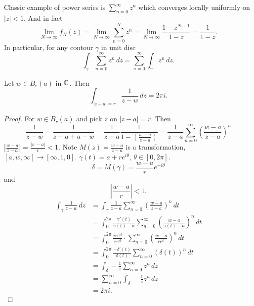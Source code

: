 \documentclass[10pt, a4paper]{article}
\begin{document}
Classic example of power series is $\displaystyle\sum_{n = 0}^{\infty}z ^ n$ which converges locally uniformly on $|z| < 1$.
And in fact
\[
\lim_{N \to \infty}f_N(z) = \lim_{N \to \infty}\sum_{n = 0}^{N}z ^ n = \lim_{N \to \infty}\frac{1 - z ^ {N + 1}}{1 - z} = \frac{1}{1 - z}.
\]
In particular,
for any contour $\gamma$ in unit disc
\[
\int_{\gamma}\sum_{n = 0}^{\infty}z ^ n\,dz = \sum_{n = 0}^{\infty}\int_{\gamma}z ^ n\,dz.
\]

\begin{proposition}
    Let $w \in B_r(a)$ in $\mathbb{C}$.
    Then
    \[
    \int_{|z - a| = r}\frac{1}{z - w}\,dz = 2\pi i.
    \]

    \begin{proof}
        For $w \in B_r(a)$ and pick $z$ on $|z - a| = r$.
        Then
        \[
        \frac{1}{z - w} = \frac{1}{z - a + a - w} = \frac{1}{z - a}\frac{1}{1 - \left(\frac{w - a}{z - a}\right)} = \frac{1}{z - a}\sum_{n = 0}^{\infty}\left(\frac{w - a}{z - a}\right) ^ n
        \]
        $\left|\frac{w - a}{z - a}\right| = \frac{|w - a|}{r} < 1$.
        Note $M(z) = \frac{w - a}{z - a}$ is a \mobius transformation,
        $[a, w, \infty] \to [\infty, 1, 0]$.
        $\gamma(t) = a + re ^ {i\theta}$,
        $\theta \in [0, 2\pi]$.
        \[
        \delta = M(\gamma) = \frac{w - a}{r}e ^ {-i\theta}
        \]
        and
        \[
        \left|\frac{w - a}{r}\right| < 1.
        \]
        \begin{align*}
            \int_{\gamma}\frac{1}{z - w}\,dz &= \int_{\gamma}\frac{1}{z - a}\sum_{n = 0}^{\infty}\left(\frac{w - a}{z - a}\right) ^ n\,dt \\
            &= \int_{0}^{2\pi}\frac{\gamma'(t)}{\gamma(t) - a}\sum_{n = 0}^{\infty}\left(\frac{w - a}{\gamma(t) - a}\right) ^ n\,dt \\
            &= \int_{0}^{2\pi}\frac{ire ^ {it}}{re ^ {it}}\cdot\sum_{n = 0}^{\infty}\left(\frac{w - a}{re ^ {it}}\right) ^n\,dt \\
            &= \int_{0}^{2\pi}\frac{-\delta'(t)}{\delta(t)}\sum_{n = 0}^{\infty}(\delta(t)) ^ n\,dt \\
            &= \int_{\delta}-\frac{1}{z}\sum_{n = 0}^{\infty}z ^ n\,dz \\
            &= \sum_{n = 0}^{\infty}\int_{\delta}-\frac{1}{z}z ^ n\,dz \\
            &= 2\pi i.
        \end{align*}
    \end{proof}
\end{proposition}
\end{document}
